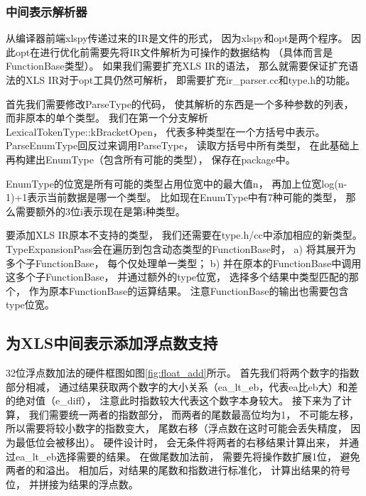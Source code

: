 \subsubsection{中间表示解析器}\label{ir_parser}

从编译器前端xlspy传递过来的IR是文件的形式，
因为xlspy和opt是两个程序。
因此opt在进行优化前需要先将IR文件解析为可操作的数据结构
（具体而言是FunctionBase类型）。
如果我们需要扩充XLS IR的语法，
那么就需要保证扩充语法的XLS IR对于opt工具仍然可解析，
即需要扩充ir\_parser.cc和type.h的功能。

首先我们需要修改ParseType的代码，
使其解析的东西是一个多种参数的列表，
而非原本的单个类型。
我们在第一个分支解析LexicalTokenType::kBracketOpen，
代表多种类型在一个方括号中表示。
ParseEnumType回反过来调用ParseType，
读取方括号中所有类型，
在此基础上再构建出EnumType（包含所有可能的类型），
保存在package中。

EnumType的位宽是所有可能的类型占用位宽中的最大值n，
再加上位宽log(n-1)+1表示当前数据是哪一个类型。
比如现在EnumType中有7种可能的类型，
那么需要额外的3位i表示现在是第i种类型。

要添加XLS IR原本不支持的类型，
我们还需要在type.h/cc中添加相应的新类型。
TypeExpansionPass会在遍历到包含动态类型的FunctionBase时，
a) 将其展开为多个子FunctionBase，
每个仅处理单一类型；
b) 并在原本的FunctionBase中调用这多个子FunctionBase，
并通过额外的type位宽，
选择多个结果中类型匹配的那个，
作为原本FunctionBase的运算结果。
注意FunctionBase的输出也需要包含type位宽。


\subsection{为XLS中间表示添加浮点数支持}

32位浮点数加法的硬件框图如图\ref{fig:float_add}所示。
首先我们将两个数字的指数部分相减，
通过结果获取两个数字的大小关系（ea\_lt\_eb，代表ea比eb大）和差的绝对值（e\_diff），
注意此时指数较大代表这个数字本身较大。
接下来为了计算，
我们需要统一两者的指数部分，
而两者的尾数最高位均为1，
不可能左移，
所以需要将较小数字的指数变大，
尾数右移（浮点数在这时可能会丢失精度，
因为最低位会被移出）。
硬件设计时，
会无条件将两者的右移结果计算出来，
并通过ea\_lt\_eb选择需要的结果。
在做尾数加法前，
需要先将操作数扩展1位，
避免两者的和溢出。
相加后，对结果的尾数和指数进行标准化，
计算出结果的符号位，
并拼接为结果的浮点数。

